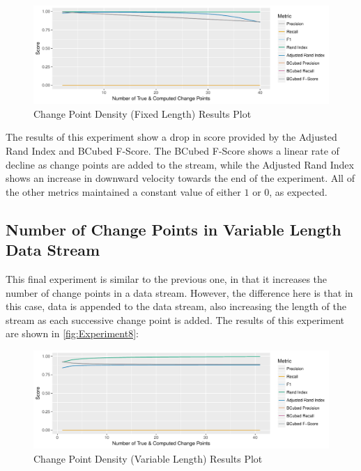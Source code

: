 \documentclass[../main.tex]{subfiles}
\begin{document}
\begin{figure}[h]
    \includegraphics[width=\textwidth]{figures/Experiment8}
    \caption{Change Point Density (Fixed Length) Results Plot}
    \label{fig:Experiment7}
\end{figure}

The results of this experiment show a drop in score provided by the Adjusted Rand Index and BCubed F-Score. The BCubed F-Score shows a linear rate of decline as change points are added to the stream, while the Adjusted Rand Index shows an increase in downward velocity towards the end of the experiment. All of the other metrics maintained a constant value of either $1$ or $0$, as expected.

\subsection{Number of Change Points in Variable Length Data Stream}

This final experiment is similar to the previous one, in that it increases the number of change points in a data stream. However, the difference here is that in this case, data is appended to the data stream, also increasing the length of the stream as each successive change point is added. The results of this experiment are shown in \autoref{fig:Experiment8}:

\begin{figure}[H]
    \includegraphics[width=\textwidth]{figures/Experiment7}
    \caption{Change Point Density (Variable Length) Results Plot}
    \label{fig:Experiment8}
\end{figure}
\end{document}
